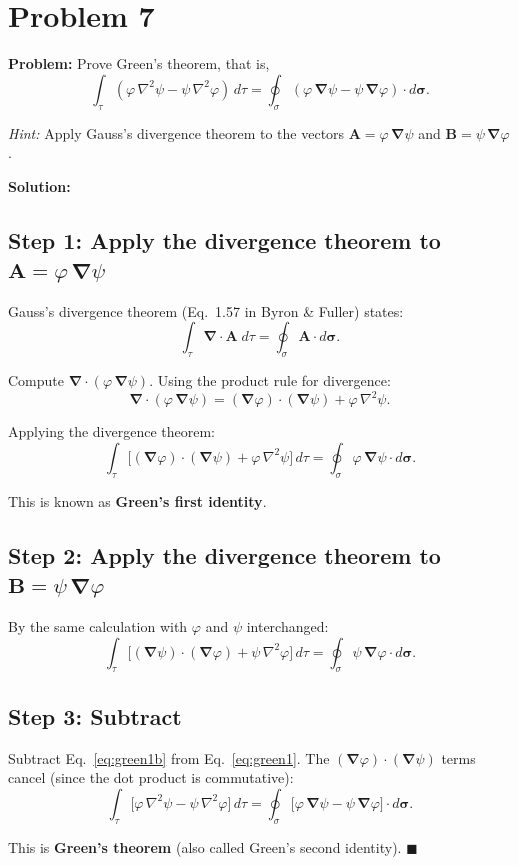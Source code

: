 \documentclass[12pt]{article}
\newcommand{\vect}[1]{\mathbf{#1}}
\newcommand{\grad}{\boldsymbol{\nabla}}
\begin{document}
\section*{Problem 7}

\textbf{Problem:} Prove Green's theorem, that is,
\[
\int_\tau (\varphi\,\nabla^2\psi - \psi\,\nabla^2\varphi)\,d\tau = \oint_\sigma (\varphi\,\grad\psi - \psi\,\grad\varphi)\cdot d\boldsymbol{\sigma}.
\]

\textit{Hint:} Apply Gauss's divergence theorem to the vectors $\vect{A} = \varphi\,\grad\psi$ and $\vect{B} = \psi\,\grad\varphi$.

\bigskip
\textbf{Solution:}

\subsection*{Step 1: Apply the divergence theorem to $\vect{A} = \varphi\,\grad\psi$}

Gauss's divergence theorem (Eq.~1.57 in Byron \& Fuller) states:
\[
\int_\tau \grad\cdot\vect{A}\;d\tau = \oint_\sigma \vect{A}\cdot d\boldsymbol{\sigma}.
\]

Compute $\grad\cdot(\varphi\,\grad\psi)$. Using the product rule for divergence:
\[
\grad\cdot(\varphi\,\grad\psi) = (\grad\varphi)\cdot(\grad\psi) + \varphi\,\nabla^2\psi.
\]

Applying the divergence theorem:
\begin{equation}
\int_\tau \bigl[(\grad\varphi)\cdot(\grad\psi) + \varphi\,\nabla^2\psi\bigr]\,d\tau = \oint_\sigma \varphi\,\grad\psi \cdot d\boldsymbol{\sigma}. \label{eq:green1}
\end{equation}

This is known as \textbf{Green's first identity}.

\subsection*{Step 2: Apply the divergence theorem to $\vect{B} = \psi\,\grad\varphi$}

By the same calculation with $\varphi$ and $\psi$ interchanged:
\begin{equation}
\int_\tau \bigl[(\grad\psi)\cdot(\grad\varphi) + \psi\,\nabla^2\varphi\bigr]\,d\tau = \oint_\sigma \psi\,\grad\varphi \cdot d\boldsymbol{\sigma}. \label{eq:green1b}
\end{equation}

\subsection*{Step 3: Subtract}

Subtract Eq.~\eqref{eq:green1b} from Eq.~\eqref{eq:green1}. The $(\grad\varphi)\cdot(\grad\psi)$ terms cancel (since the dot product is commutative):
\[
\int_\tau \bigl[\varphi\,\nabla^2\psi - \psi\,\nabla^2\varphi\bigr]\,d\tau = \oint_\sigma \bigl[\varphi\,\grad\psi - \psi\,\grad\varphi\bigr]\cdot d\boldsymbol{\sigma}.
\]

This is \textbf{Green's theorem} (also called Green's second identity). \hfill $\blacksquare$
\end{document}
